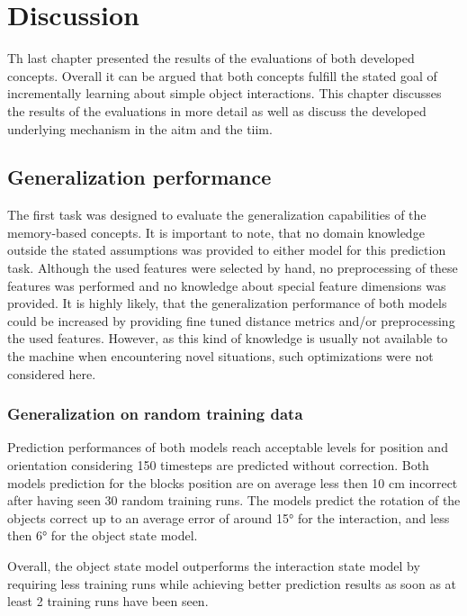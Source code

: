 \chapter{Discussion \label{chap:discussion}}

Th last chapter presented the results of the evaluations of both developed concepts. Overall it can be argued that both concepts fulfill the stated goal of incrementally learning about simple object interactions. This chapter discusses the results of the evaluations in more detail as well as discuss the developed underlying mechanism in the \gls{aitm} and the \gls{tiim}.

\section{Generalization performance}

The first task was designed to evaluate the generalization capabilities of the memory-based concepts. It is important to note, that no domain knowledge outside the stated assumptions was provided to either model for this prediction task. Although the used features were selected by hand, no preprocessing of these features was performed and no knowledge about special feature dimensions was provided. It is highly likely, that the generalization performance of both models could be increased by providing fine tuned distance metrics and/or preprocessing the used features.
However, as this kind of knowledge is usually not available to the machine when encountering novel situations, such optimizations were not considered here.

\subsection{Generalization on random training data}

Prediction performances of both models reach acceptable levels for position and orientation considering 150 timesteps are predicted without correction. 
Both models prediction for the blocks position are on average less then 10 cm incorrect after having seen 30 random training runs. The models predict the rotation of the objects correct up to an average error of around 15° for the interaction, and less then 6° for the object state model.

Overall, the object state model outperforms the interaction state model by requiring less training runs while achieving better prediction results as soon as at least 2 training runs have been seen.

